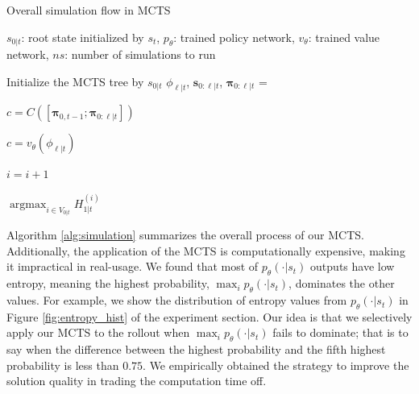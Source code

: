 \documentclass{article}
\DeclareMathOperator*{\argmax}{argmax}
\begin{document}
\begin{algorithm}

\caption{Overall simulation flow in MCTS}\label{alg:simulation}
\begin{algorithmic}[1]
\Require $s_{0|t}$: root state initialized by $s_t$, $p_{\theta}$: trained policy network, $v_{\theta}$: trained value network, $ns$: number of simulations to run

\item[]
\State Initialize the MCTS tree by $s_{0|t}$
    \State $\phi_{\ell|t}$,  $\boldsymbol{s}_{0:\ell|t}$,  $\boldsymbol{\pi}_{0:\ell|t}$ =    

    \State {}   

     
        \State $c = C([\boldsymbol{\pi}_{0,t-1}; \boldsymbol{\pi}_{0:\ell | t}])$  

    \Else
        \State $c = v_\theta(\phi_{\ell|t})$   

    \EndIf

    \item[]

    \State {}
    \State $i = i + 1$
    \item[]

\EndWhile

\State \Return $\argmax_{i \in V_{0|t}} H^{(i)}_{1|t}$

\end{algorithmic}
\end{algorithm}


Algorithm \ref{alg:simulation} summarizes the overall process of our MCTS. Additionally, the application of the MCTS is computationally expensive, making it impractical in real-usage. We found that most of $p_\theta(\cdot|s_t)$ outputs have low entropy, meaning the highest probability, $\max_{i} p_\theta(\cdot|s_t)$, dominates the other values. For example, we show the distribution of entropy values from $p_\theta(\cdot|s_t)$ in Figure \ref{fig:entropy_hist} of the experiment section.
Our idea is that we selectively apply our MCTS to the rollout when $\max_{i} p_\theta(\cdot|s_t)$ fails to dominate; that is to say when the difference between the highest probability and the fifth highest probability is less than $0.75$. We empirically obtained the strategy to improve the solution quality in trading the computation time off.
\end{document}
